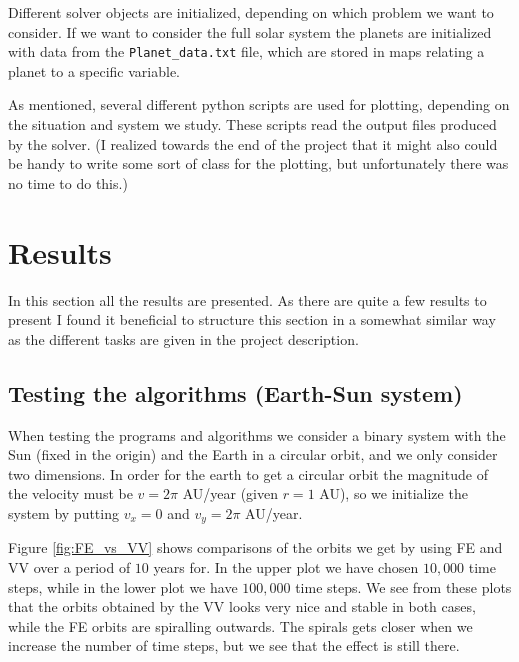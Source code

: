 \documentclass[12pt, a4paper]{article}
\begin{document}
Different solver objects are initialized, depending on which problem we want to consider. If we want to 
consider the full solar system the planets are initialized with data from the \texttt{Planet\_data.txt} 
file, which are stored in maps relating a planet to a specific variable.  

As mentioned, several different python scripts are used for plotting, depending on the situation and 
system we study. These scripts read the output files produced by the solver. (I realized towards 
the end of the project that it might also could be handy to write some sort of class for the plotting, 
but unfortunately there was no time to do this.) 

\section{Results}

In this section all the results are presented. As there are quite a few results to present I found it 
beneficial to structure this section in a somewhat similar way as the different tasks are given in the 
project description. 

\subsection{Testing the algorithms (Earth-Sun system)}

When testing the programs and algorithms we consider a binary system with the Sun (fixed in the origin) 
and the Earth in a circular orbit, and we only consider two dimensions. In order for the earth to 
get a circular orbit the magnitude of the velocity must be $v=2\pi$ AU/year (given $r = 1$ AU), so we 
initialize the system by putting $v_x = 0$ and $v_y = 2\pi$ AU/year. 

Figure \ref{fig:FE_vs_VV} shows comparisons of the orbits we get by using FE and VV 
over a period of $10$ years for. In the upper plot we have chosen $10,000$ time steps, while in 
the lower plot we have $100,000$ time steps. We see from these plots that the orbits obtained by the 
VV looks very nice and stable in both cases, while the FE orbits are spiralling outwards. The spirals 
gets closer when we increase the number of time steps, but we see that the effect is still there. 
\end{document}
